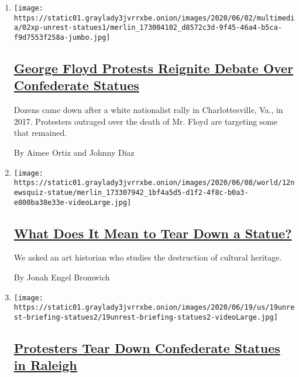 \begin{enumerate}
\def\labelenumi{\arabic{enumi}.}
\item
  \texttt{[image: https://static01.graylady3jvrrxbe.onion/images/2020/06/02/multimedia/02xp-unrest-statues1/merlin\_173004102\_d8572c3d-9f45-46a4-b5ca-f9d7553f258a-jumbo.jpg]}

  \hypertarget{george-floyd-protests-reignite-debate-over-confederate-statues}{%
  \subsection{\texorpdfstring{\href{/2020/06/03/us/confederate-statues-george-floyd.html}{George
  Floyd Protests Reignite Debate Over Confederate
  Statues}}{George Floyd Protests Reignite Debate Over Confederate Statues}}\label{george-floyd-protests-reignite-debate-over-confederate-statues}}

  Dozens came down after a white nationalist rally in Charlottesville,
  Va., in 2017. Protesters outraged over the death of Mr. Floyd are
  targeting some that remained.

  By Aimee Ortiz and Johnny Diaz
\item
  \texttt{[image: https://static01.graylady3jvrrxbe.onion/images/2020/06/08/world/12newsquiz-statue/merlin\_173307942\_1bf4a5d5-d1f2-4f8c-b0a3-e800ba38e33e-videoLarge.jpg]}

  \hypertarget{what-does-it-mean-to-tear-down-a-statue}{%
  \subsection{\texorpdfstring{\href{/2020/06/11/style/confederate-statue-columbus-analysis.html}{What
  Does It Mean to Tear Down a
  Statue?}}{What Does It Mean to Tear Down a Statue?}}\label{what-does-it-mean-to-tear-down-a-statue}}

  We asked an art historian who studies the destruction of cultural
  heritage.

  By Jonah Engel Bromwich
\item
  \texttt{[image: https://static01.graylady3jvrrxbe.onion/images/2020/06/19/us/19unrest-briefing-statues2/19unrest-briefing-statues2-videoLarge.jpg]}

  \hypertarget{protesters-tear-down-confederate-statues-in-raleigh}{%
  \subsection{\texorpdfstring{\href{/video/us/100000007201763/raleigh-confederate-monument.html}{Protesters
  Tear Down Confederate Statues in
  Raleigh}}{Protesters Tear Down Confederate Statues in Raleigh}}\label{protesters-tear-down-confederate-statues-in-raleigh}}


\end{enumerate}
